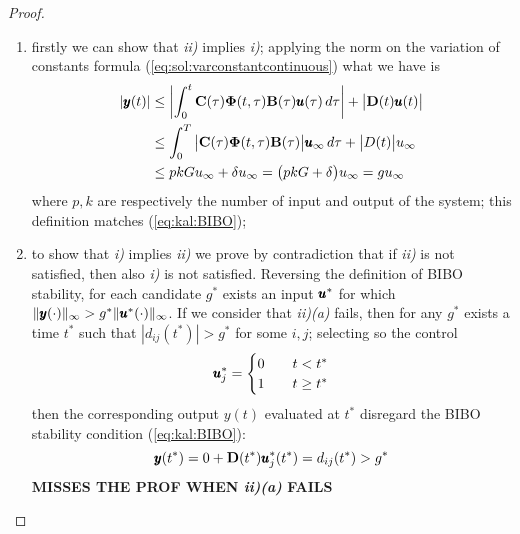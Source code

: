 	\begin{proof}
	\begin{enumerate}[\itshape a)]
		\item firstly we can show that \textit{ii)} implies \textit{i)}; applying the norm on the variation of constants formula (\ref{eq:sol:varconstantcontinuous}) what we have is
		\begin{align*}
			|\pmb{y}(t)| & \leq \left| \int_0^t \mathbf{C}(\tau)\mathbf{\Phi}(t,\tau)\mathbf{B}(\tau)\pmb{u}(\tau)\, d\tau \right| + \big|\mathbf{D}(t)\pmb{u}(t)\big| \\
			& \leq \int_0^T \big|\mathbf{C}(\tau)\mathbf{\Phi}(t,\tau)\mathbf{B}(\tau)\big|\pmb{u}_\infty\, d\tau + \big|D(t)\big|u_\infty \\
			& \leq pkG u_\infty + \delta u_\infty = \big(pkG + \delta\big) u_\infty  = gu_\infty
		\end{align*}
		where $p,k$ are respectively the number of input and output of the system; this definition matches (\ref{eq:kal:BIBO});
		
		\item to show that \textit{i)} implies \textit{ii)} we prove by contradiction that if \textit{ii)} is not satisfied, then also \textit{i)} is not satisfied. Reversing the definition of BIBO stability, for each candidate $g^*$ exists an input $\pmb{u}^*$ for which $\|\pmb{y}(\cdot)\|_\infty > g^* \|\pmb{u}^*(\cdot)\|_\infty$. If we consider that \textit{ii)(a)} fails,  then for any $g^*$ exists a time $t^*$ such that $|d_{ij}(t^*)| > g^*$ for some $i,j$; selecting so the control
		\[ \pmb{u}_j^* = \begin{cases}
			0 \quad & t < t^* \\ 1 & t \geq  t^*
		\end{cases} \]
		then the corresponding output $y(t)$ evaluated at $t^*$ disregard the BIBO stability condition (\ref{eq:kal:BIBO}):
		\[ \pmb{y}(t^*) = 0 + \mathbf{D}(t^*)\pmb{u}_j^*(t^*) = d_{ij}(t^*) > g^* \]
		\textbf{MISSES THE PROF WHEN \textit{ii)(a)} FAILS}
	\end{enumerate}
	\end{proof}
	
